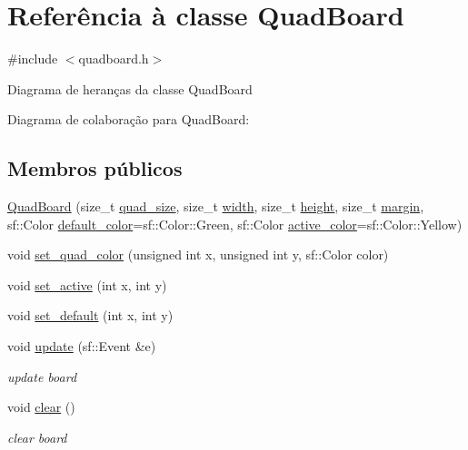 \hypertarget{classQuadBoard}{}\section{Referência à classe Quad\+Board}
\label{classQuadBoard}


{\ttfamily \#include $<$quadboard.\+h$>$}



Diagrama de heranças da classe Quad\+Board


Diagrama de colaboração para Quad\+Board\+:
\subsection*{Membros públicos}
\begin{DoxyCompactItemize}
\item 
\hyperlink{classQuadBoard_aaf660c18a1bf1e41ba592a57ff26b69b}{Quad\+Board} (size\+\_\+t \hyperlink{classQuadBoard_ad07dae11e342f91f28b562441392523b}{quad\+\_\+size}, size\+\_\+t \hyperlink{classQuadBoard_a2e816c0a22fdaaf5efe57d4f05927f15}{width}, size\+\_\+t \hyperlink{classQuadBoard_a6db254c6e18450c8360ae6e7812a45c1}{height}, size\+\_\+t \hyperlink{classQuadBoard_a16bb409d20f76da6821f061792e87cae}{margin}, sf\+::\+Color \hyperlink{classQuadBoard_accb4dd5701108279703e9835cb777e8c}{default\+\_\+color}=sf\+::\+Color\+::\+Green, sf\+::\+Color \hyperlink{classQuadBoard_ad89b47afa74de80a44b9c4b71636203a}{active\+\_\+color}=sf\+::\+Color\+::\+Yellow)
\item 
void \hyperlink{classQuadBoard_a4d81d21ac5d21c457dd416ab83b84a20}{set\+\_\+quad\+\_\+color} (unsigned int x, unsigned int y, sf\+::\+Color color)
\item 
void \hyperlink{classQuadBoard_a47799adc84ee9172ce58e6aff826896e}{set\+\_\+active} (int x, int y)
\item 
void \hyperlink{classQuadBoard_a717f22cb86159b20b9cbfcf83b230d51}{set\+\_\+default} (int x, int y)
\item 
void \hyperlink{classQuadBoard_a66fade767417acd4d84532e108bccd09}{update} (sf\+::\+Event \&e)
\begin{DoxyCompactList}\small\item\em update board \end{DoxyCompactList}\item 
void \hyperlink{classQuadBoard_af675581ac14af027e148683150069e17}{clear} ()
\begin{DoxyCompactList}\small\item\em clear board \end{DoxyCompactList}\item 

\end{DoxyCompactItemize}
